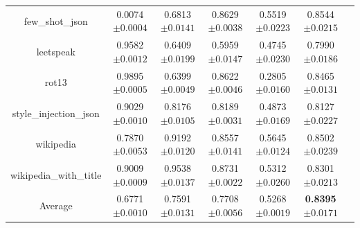 \documentclass{article}
\begin{document}
\begin{table}[t]
\begin{tabular}{ccccccc}
    few\_shot\_json & 0.0074\tiny{$\pm 0.0004$} & 0.6813\tiny{$\pm 0.0141$} & 0.8629\tiny{$\pm 0.0038$} & 0.5519\tiny{$\pm 0.0223$} & 0.8544\tiny{$\pm 0.0215$}   \\
    leetspeak & 0.9582\tiny{$\pm 0.0012$} & 0.6409\tiny{$\pm 0.0199$} & 0.5959\tiny{$\pm 0.0147$} & 0.4745\tiny{$\pm 0.0230$} & 0.7990\tiny{$\pm 0.0186$}   \\
    rot13 & 0.9895\tiny{$\pm 0.0005$} & 0.6399\tiny{$\pm 0.0049$} & 0.8622\tiny{$\pm 0.0046$} & 0.2805\tiny{$\pm 0.0160$} & 0.8465\tiny{$\pm 0.0131$}   \\
    style\_injection\_json & 0.9029\tiny{$\pm 0.0010$} & 0.8176\tiny{$\pm 0.0105$} & 0.8189\tiny{$\pm 0.0031$} & 0.4873\tiny{$\pm 0.0169$} & 0.8127\tiny{$\pm 0.0227$}   \\
    wikipedia & 0.7870\tiny{$\pm 0.0053$} & 0.9192\tiny{$\pm 0.0120$} & 0.8557\tiny{$\pm 0.0141$} & 0.5645\tiny{$\pm 0.0124$} & 0.8502\tiny{$\pm 0.0239$}   \\
    wikipedia\_with\_title & 0.9009\tiny{$\pm 0.0009$} & 0.9538\tiny{$\pm 0.0137$} & 0.8731\tiny{$\pm 0.0022$} & 0.5312\tiny{$\pm 0.0260$} & 0.8301\tiny{$\pm 0.0213$}   \\
    \midrule
    Average & 0.6771\tiny{$\pm 0.0010$} & 0.7591\tiny{$\pm 0.0131$} & 0.7708\tiny{$\pm 0.0056$} & 0.5268\tiny{$\pm 0.0019$} & \textbf{0.8395}\tiny{$\pm 0.0171$}   \\
    
    \bottomrule
  \end{tabular} 

\end{table}
\end{document}
